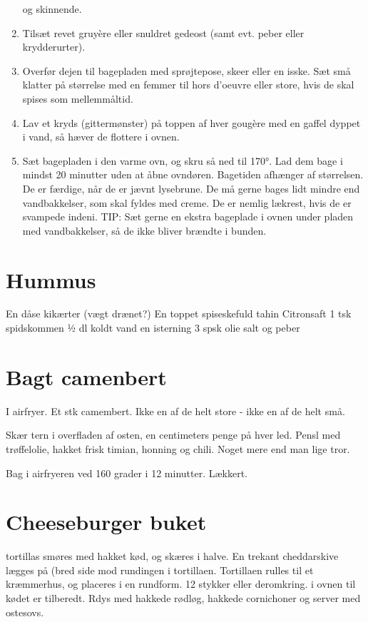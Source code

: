 \documentclass[
]{book}
\begin{document}
\begin{enumerate}
  og skinnende.
\item
  Tilsæt revet gruyère eller snuldret gedeost (samt evt. peber eller krydderurter).
\item
  Overfør dejen til bagepladen med sprøjtepose, skeer eller en isske. Sæt små klatter på størrelse med
  en femmer til hors d'oeuvre eller store, hvis de skal spises som mellemmåltid.
\item
  Lav et kryds (gittermønster) på toppen af hver gougère med en gaffel dyppet i vand, så hæver de
  flottere i ovnen.
\item
  Sæt bagepladen i den varme ovn, og skru så ned til 170°. Lad dem bage i mindst 20 minutter uden at
  åbne ovndøren. Bagetiden afhænger af størrelsen. De er færdige, når de er jævnt lysebrune. De må
  gerne bages lidt mindre end vandbakkelser, som skal fyldes med creme. De er nemlig lækrest, hvis de er
  svampede indeni.
  TIP: Sæt gerne en ekstra bageplade i ovnen under pladen med vandbakkelser, så de ikke bliver brændte
  i bunden.
\end{enumerate}

\hypertarget{hummus}{%
\section{Hummus}\label{hummus}}

En dåse kikærter (vægt drænet?)
En toppet spiseskefuld tahin
Citronsaft
1 tsk spidskommen
½ dl koldt vand
en isterning
3 spsk olie
salt og peber

\hypertarget{bagt-camenbert}{%
\section{Bagt camenbert}\label{bagt-camenbert}}

I airfryer. Et stk camembert. Ikke en af de helt store - ikke en af de helt små.

Skær tern i overfladen af osten, en centimeters penge på hver led.
Pensl med trøffelolie, hakket frisk timian, honning og chili. Noget mere end man
lige tror.

Bag i airfryeren ved 160 grader i 12 minutter. Lækkert.

\hypertarget{cheeseburger-buket}{%
\section{Cheeseburger buket}\label{cheeseburger-buket}}

tortillas smøres med hakket kød, og skæres i halve.
En trekant cheddarskive lægges på (bred side mod rundingen i tortillaen.
Tortillaen rulles til et kræmmerhus, og placeres i en rundform. 12 stykker eller
deromkring. i ovnen til kødet er tilberedt. Rdys med hakkede rødløg, hakkede
cornichoner og server med ostesovs.
\end{document}
